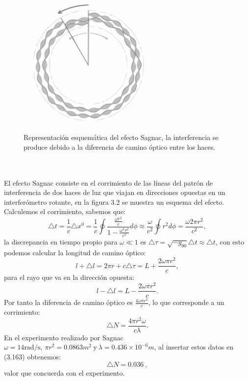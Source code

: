 \begin{figure}[h!]
\centering
\includegraphics[width=7cm]{Imagenes/Fig18}
\caption[Representación esquemática del efecto Sagnac.]{Representación esquemática del efecto Sagnac, la interferencia se produce debido a la diferencia de camino óptico entre los haces.}
\end{figure}
\\
\\
El efecto Sagnac consiste en el corrimiento de las líneas del patrón de interferencia de dos haces de luz que viajan en direcciones opuestas en un interferómetro rotante, en la figura 3.2 se muestra un esquema del efecto. Calculemos el corrimiento, sabemos que:
\begin{equation}
\triangle t=\frac{1}{c}\triangle x^{0}=\frac{1}{c}\oint\frac{\frac{\omega r^{2}}{c}}{1-\frac{\omega^{2}r^{2}}{c^{2}}}d\phi\approx\frac{\omega}{c^{2}}\oint r^{2}d\phi=\frac{\omega2\pi r^{2}}{c^{2}},
\end{equation}
la discrepancia en tiempo propio para $\omega \ll 1$ es $\triangle \tau =\sqrt{-g_{00}}\triangle t\approx \triangle t$, con esto podemos calcular la longitud de camino óptico:
\begin{equation}
l+\triangle l=2\pi r+c\triangle \tau =L+\frac{2\omega \pi r^2}{c},
\end{equation}  
para el rayo que va en la dirección opuesta:
\begin{equation}
l-\triangle l=L-\frac{2\omega \pi r^2}{c}.
\end{equation}
Por tanto la diferencia de camino óptico es $\frac{4\omega \pi r^2}{c}$, lo que corresponde a un corrimiento:
\begin{equation}
\triangle N= \frac{4\pi r^2\omega}{c\lambda}.
\end{equation}
En el experimento realizado por Sagnac $\omega=14\text{rad/s},\ \pi r^2=0.0863 m^2\ \text{y}\ \lambda=0.436\times10^{-6}m$, al insertar estos datos en (3.163) obtenemos:
\begin{equation}
\triangle N=0.036\ ,
\end{equation}
valor que concuerda con el experimento.
